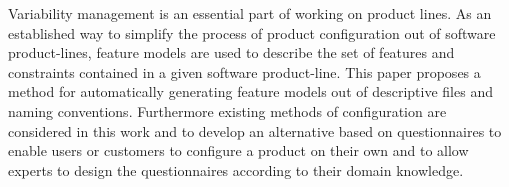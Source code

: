 Variability management is an essential part of working on product lines.
As an established way to simplify the process of product configuration out of software product-lines, feature models are used to describe the set of features and constraints contained in a given software product-line. This paper proposes a method for automatically generating feature models out of descriptive files and naming conventions.
Furthermore existing methods of configuration are considered in this work and to develop an alternative based on questionnaires to enable users or customers to configure a product on their own and to allow experts to design the questionnaires according to their domain knowledge.